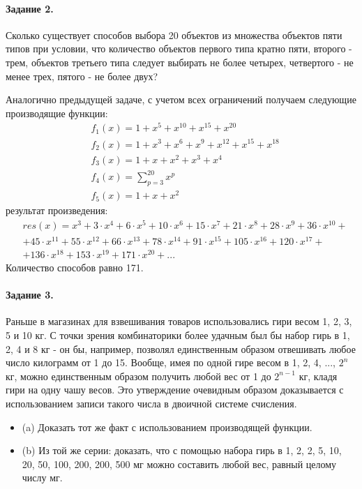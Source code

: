 \documentclass[a4paper,12pt]{article}
\begin{document}
\paragraph{Задание 2.} Сколько существует способов выбора 20 объектов из множества объектов пяти типов при условии, что количество объектов первого типа кратно пяти, второго - трем, объектов третьего типа следует выбирать не более четырех, четвертого - не менее трех, пятого - не более двух?

\begin{Solution}
Аналогично предыдущей задаче, с учетом всех ограничений получаем следующие производящие функции:
\[
	\begin{split}
		&f_1\left(x\right)=1+x^5+x^{10}+x^{15}+x^{20}\\
		&f_2\left(x\right)=1+x^3+x^6+x^9+x^{12}+x^{15}+x^{18}\\
		&f_3\left(x\right)=1+x+x^2+x^3+x^4\\
		&f_4\left(x\right)=\sum_{p=3}^{20} x^p\\
		&f_5\left(x\right)=1+x+x^2
	\end{split}
\]
результат произведения:
\[
	\begin{split}
		&res\left(x\right)=x^3+3\cdot x^4+6\cdot x^5+10\cdot x^6+15\cdot x^7+21\cdot x^8+28\cdot x^9+36\cdot x^{10}+\\
		&+45\cdot x^{11}+55\cdot x^{12}+66\cdot x^{13}+78\cdot x^{14}+91\cdot x^{15}+105\cdot x^{16}+120\cdot x^{17}+\\
		&+136\cdot x^{18}+153\cdot x^{19}+171\cdot x^{20}+...
	\end{split}
\]
Количество способов равно 171.
\end{Solution}

\paragraph{Задание 3.} Раньше в магазинах для взвешивания товаров использовались гири весом 1, 2, 3, 5 и 10 кг. С точки зрения комбинаторики более удачным был бы набор гирь в 1, 2, 4 и 8 кг - он бы, например, позволял единственным образом отвешивать любое число килограмм от 1 до 15. Вообще, имея по одной гире весом в 1, 2, 4, ..., $2^n$ кг, можно единственным образом получить любой вес от 1 до $2^{n-1}$ кг, кладя гири на одну чашу весов. Это утверждение очевидным образом доказывается с использованием записи такого числа в двоичной системе счисления.

\begin{itemize}
\item (a) Доказать тот же факт с использованием производящей функции.

\item (b) Из той же серии: доказать, что с помощью набора гирь в 1, 2, 2, 5, 10, 20, 50, 100, 200, 200, 500 мг можно составить любой вес, равный целому числу мг.
\end{itemize}
\end{document}
